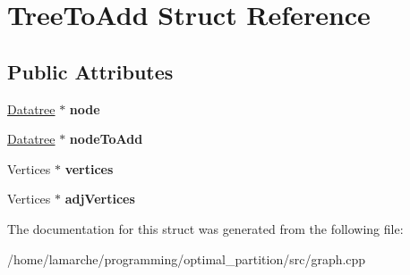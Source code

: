 \hypertarget{structTreeToAdd}{\section{Tree\-To\-Add Struct Reference}
\label{structTreeToAdd}
}
\subsection*{Public Attributes}
\begin{DoxyCompactItemize}
\item 
\hypertarget{structTreeToAdd_abebc54c95ff5f9c39b5c888c48e20cc7}{\hyperlink{classDatatree}{Datatree} $\ast$ {\bfseries node}}\label{structTreeToAdd_abebc54c95ff5f9c39b5c888c48e20cc7}

\item 
\hypertarget{structTreeToAdd_aa77d6e9cc086cdda22594aa24cdcf747}{\hyperlink{classDatatree}{Datatree} $\ast$ {\bfseries node\-To\-Add}}\label{structTreeToAdd_aa77d6e9cc086cdda22594aa24cdcf747}

\item 
\hypertarget{structTreeToAdd_a5c6876f0c789a47f670096f88bbd4daf}{Vertices $\ast$ {\bfseries vertices}}\label{structTreeToAdd_a5c6876f0c789a47f670096f88bbd4daf}

\item 
\hypertarget{structTreeToAdd_ac68944fc8f68753e3088ae9d2110ca92}{Vertices $\ast$ {\bfseries adj\-Vertices}}\label{structTreeToAdd_ac68944fc8f68753e3088ae9d2110ca92}

\end{DoxyCompactItemize}


The documentation for this struct was generated from the following file\-:\begin{DoxyCompactItemize}
\item 
/home/lamarche/programming/optimal\-\_\-partition/src/graph.\-cpp\end{DoxyCompactItemize}
